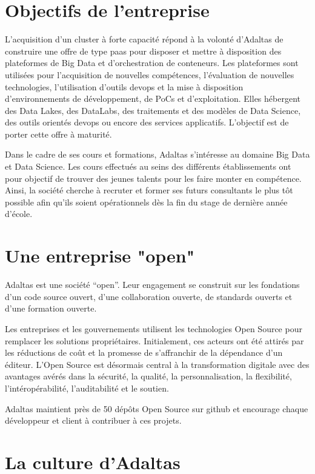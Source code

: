 \documentclass[12pt, french]{report}
\begin{document}
\section{Objectifs de l'entreprise}

L’acquisition d’un cluster à forte capacité répond à la volonté d’Adaltas de construire une offre de type \gls{paas} pour disposer et mettre à disposition des plateformes de Big Data et d’orchestration de conteneurs. Les plateformes sont utilisées pour l’acquisition de nouvelles compétences, l’évaluation de nouvelles technologies, l’utilisation d’outils \gls{devops} et la mise à disposition d’environnements de développement, de PoCs et d’exploitation. Elles hébergent des Data Lakes, des DataLabs, des traitements et des modèles de Data Science, des outils orientés \gls{devops} ou encore des services applicatifs. L’objectif est de porter cette offre à maturité.

Dans le cadre de ses cours et formations, Adaltas s'intéresse au domaine Big Data et Data Science. Les cours effectués au seins des différents établissements ont pour objectif de trouver des jeunes talents pour les faire monter en compétence. Ainsi, la société cherche à recruter et former ses futurs consultants le plus tôt possible afin qu'ils soient opérationnels dès la fin du stage de dernière année d'école.

\section{Une entreprise "open"}

Adaltas est une société “open”. Leur engagement se construit sur les fondations d’un code source ouvert, d’une collaboration ouverte, de standards ouverts et d’une formation ouverte.

Les entreprises et les gouvernements utilisent les technologies Open Source pour remplacer les solutions propriétaires. Initialement, ces acteurs ont été attirés par les réductions de coût et la promesse de s’affranchir de la dépendance d’un éditeur. L’Open Source est désormais central à la transformation digitale avec des avantages avérés dans la sécurité, la qualité, la personnalisation, la flexibilité, l’intéropérabilité, l’auditabilité et le soutien.

Adaltas maintient près de 50 dépôts Open Source sur \gls{github} et encourage chaque développeur et client à contribuer à ces projets.

\section{La culture d'Adaltas}
\end{document}
